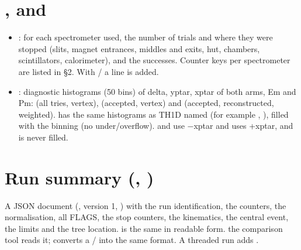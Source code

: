 \section{\texorpdfstring{,  and }{.geni, .gen and .gen.root}}\label{user_manual-07u5foutputs:73-geni-gen-and-genroot}
\begin{itemize}
\item {}: for each spectrometer used, the number of trials and where they were stopped (slits, magnet entrances,
middles and exits, hut, chambers, scintillators,\allowbreak{} calorimeter),\allowbreak{} and the successes. Counter keys per spectrometer are
listed in  §2. With \hyperref[param:usingu5fHMScoll]{}/\hyperref[param:usingu5fSHMScoll]{} a  line is added.
\item {}: diagnostic histograms (50 bins) of delta, yptar, xptar of both arms, Em and Pm:  (all tries,
vertex),  (accepted, vertex) and  (accepted, reconstructed,\allowbreak{} weighted).  has the same histograms
as TH1D named  (for example , ), filled with the  binning (no
under/\allowbreak{}overflow).  and  use −xptar and  uses +xptar, and  is never filled.
\end{itemize}
\section{\texorpdfstring{Run summary (, )}{Run summary (.summary.\allowbreak{}json,\allowbreak{} .summary.\allowbreak{}txt)}}\label{user_manual-07u5foutputs:74-run-summary-summaryjson-summarytxt}
A JSON document (, version 1, ) with the run identification,\allowbreak{} the
counters, the normalisation,\allowbreak{} all FLAGS, the stop counters, the kinematics, the central event, the limits and the tree
location.  is the same in readable form. the comparison tool  reads it;
 converts a / into the same format. A threaded run adds .


